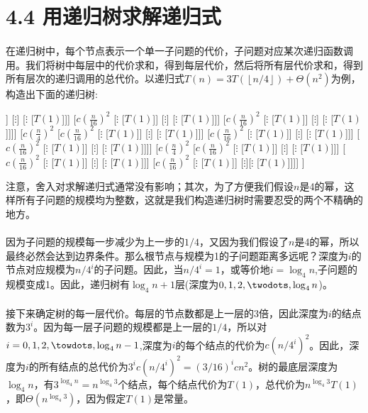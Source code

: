 \documentclass[a4paper,11pt]{article}
\newcommand{\floor}[1]{\left\lfloor #1 \right\rfloor}
\begin{document}
\section*{4.4 用递归树求解递归式}
\paragraph*{}在递归树中，每个节点表示一个单一子问题的代价，子问题对应某次递归函数调用。我们将树中每层中的代价求和，得到每层代价，然后将所有层代价求和，得到所有层次的递归调用的总代价。以递归式$T(n)=3T(\floor{n/4})+\Theta(n^2)$为例，构造出下面的递归树:\\
{\footnotesize
\begin{forest}
	[$cn^2$
		[$c(\frac{n}{4})^2$ [$c(\frac{n}{16})^2$ [$\vdots$ [$T(1)$]] [$\vdots$] [$\vdots$ [$T(1)$]]] [$c(\frac{n}{16})^2$ [$\vdots$ [$T(1)$]] [$\vdots$] [$\vdots$ [$T(1)$]]] [$c(\frac{n}{16})^2$ [$\vdots$ [$T(1)$]] [$\vdots$] [$\vdots$ [$T(1)$]]]]
		[$c(\frac{n}{4})^2$ [$c(\frac{n}{16})^2$ [$\vdots$ [$T(1)$]] [$\vdots$] [$\vdots$ [$T(1)$]]] [$c(\frac{n}{16})^2$ [$\vdots$ [$T(1)$]] [$\vdots$] [$\vdots$ [$T(1)$]]] [$c(\frac{n}{16})^2$ [$\vdots$ [$T(1)$]] [$\vdots$] [$\vdots$ [$T(1)$]]]]
		[$c(\frac{n}{4})^2$ [$c(\frac{n}{16})^2$ [$\vdots$ [$T(1)$]] [$\vdots$] [$\vdots$ [$T(1)$]]] [$c(\frac{n}{16})^2$ [$\vdots$ [$T(1)$]] [$\vdots$] [$\vdots$ [$T(1)$]]] [$c(\frac{n}{16})^2$ [$\vdots$ [$T(1)$]] [$\vdots$][$\vdots$ [$T(1)$]]]]
	]
\end{forest}%
}
注意，舍入对求解递归式通常没有影响；其次，为了方便我们假设$n$是4的幂，这样所有子问题的规模均为整数，这就是我们构造递归树时需要忍受的两个不精确的地方。
\paragraph*{}因为子问题的规模每一步减少为上一步的$1/4$，又因为我们假设了$n$是4的幂，所以最终必然会达到边界条件。那么根节点与规模为1的子问题距离多远呢？深度为$i$的节点对应规模为$n/4^i$的子问题。因此，当$n/4^i=1$，或等价地$i=\log_{4}{n}$,子问题的规模变成1。因此，递归树有$\log_{4}{n}+1$层(深度为$0,1,2,\twodots,\log_{4}{n}$)。
\paragraph*{}接下来确定树的每一层代价。每层的节点数都是上一层的3倍，因此深度为$i$的结点数为$3^i$。因为每一层子问题的规模都是上一层的$1/4$，所以对$i=0,1,2,\towdots,\log_{4}{n}-1$,深度为$i$的每个结点的代价为$c(n/4^i)^2$。因此，深度为$i$的所有结点的总代价为$3^ic(n/4^i)^2=(3/16)^icn^2$。树的最底层深度为$\log_{4}{n}$，有$3^{\log_{4}{n}}=n^{\log_{4}{3}}$个结点，每个结点代价为$T(1)$，总代价为$n^{\log_{4}{3}}T(1)$，即$\Theta(n^{\log_{4}{3}})$，因为假定$T(1)$是常量。
\end{document}
